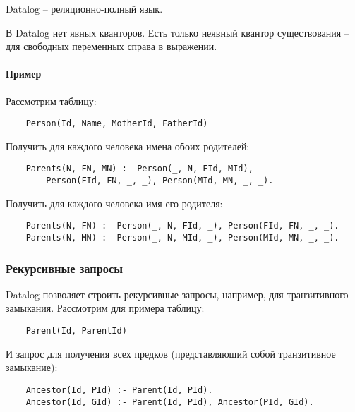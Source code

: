 \begin{proposition}
	Datalog -- реляционно-полный язык.
\end{proposition}

\begin{remark}
	В Datalog нет явных кванторов. Есть только неявный квантор существования -- для свободных
	переменных справа в выражении.
\end{remark}

\paragraph{Пример}

Рассмотрим таблицу:

\begin{lstlisting}
    Person(Id, Name, MotherId, FatherId)
\end{lstlisting}

Получить для каждого человека имена обоих родителей:

\begin{lstlisting}
    Parents(N, FN, MN) :- Person(_, N, FId, MId),
        Person(FId, FN, _, _), Person(MId, MN, _, _).
\end{lstlisting}

Получить для каждого человека имя его родителя:

\begin{lstlisting}
    Parents(N, FN) :- Person(_, N, FId, _), Person(FId, FN, _, _).
    Parents(N, MN) :- Person(_, N, MId, _), Person(MId, MN, _, _).
\end{lstlisting}

\subsubsection{Рекурсивные запросы}

Datalog позволяет строить рекурсивные запросы, например, для транзитивного замыкания. Рассмотрим
для примера таблицу:

\begin{lstlisting}
    Parent(Id, ParentId)
\end{lstlisting}

И запрос для получения всех предков (представляющий собой транзитивное замыкание):

\begin{lstlisting}
    Ancestor(Id, PId) :- Parent(Id, PId).
    Ancestor(Id, GId) :- Parent(Id, PId), Ancestor(PId, GId).
\end{lstlisting}

